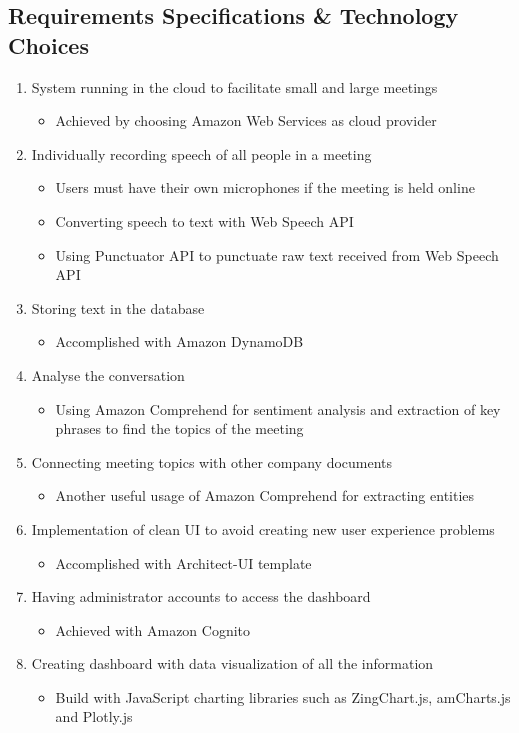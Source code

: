 \documentclass{article}
\begin{document}
\subsection{Requirements Specifications \& Technology Choices}
{\large 
\begin{enumerate}
    \item System running in the cloud to facilitate small and large meetings
        \begin{itemize}
        \item Achieved by choosing Amazon Web Services as cloud provider
        \end{itemize}
    \item Individually recording speech of all people in a meeting
        \begin{itemize}
        \item Users must have their own microphones if the meeting is held online
        \item Converting speech to text with Web Speech API
        \item Using Punctuator API to punctuate raw text received from Web Speech API
        \end{itemize}
    \item Storing text in the database
        \begin{itemize}
        \item Accomplished with Amazon DynamoDB
        \end{itemize}
    \item Analyse the conversation
        \begin{itemize}
        \item Using Amazon Comprehend for sentiment analysis and extraction of key phrases to find the topics of the meeting
        \end{itemize}
    \item Connecting meeting topics with other company documents
        \begin{itemize}
        \item Another useful usage of Amazon Comprehend for extracting entities
        \end{itemize}
    \item Implementation of clean UI to avoid creating new user experience problems
        \begin{itemize}
        \item Accomplished with Architect-UI template
        \end{itemize}
    \item Having administrator accounts to access the dashboard
        \begin{itemize}
        \item Achieved with Amazon Cognito
        \end{itemize}
    \item Creating dashboard with data visualization of all the information
        \begin{itemize}
        \item Build with JavaScript charting libraries such as ZingChart.js, amCharts.js and Plotly.js
        \end{itemize}
\end{enumerate}
}
\end{document}

